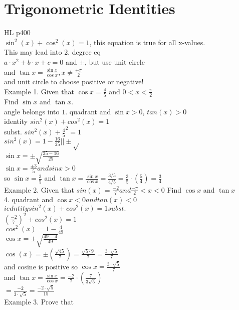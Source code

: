 \documentclass{article}
\begin{document}
  \section{Trigonometric Identities}
  HL p400\\
  $\sin^2(x)+\cos^2(x)=1$, this equation is true for all x-values.\\
  This may lead into 2. degree eq\\
  $a\cdot x^2+b\cdot x+c=0$ and $\pm$, but use unit circle\\
  and $\tan x=\frac{\sin x}{\cos x}, x\neq\frac{\pm\pi}{2}$\\
  and unit circle to choose positive or negative!\\
  Example 1. Given that $\cos x=\frac{4}{5}$ and $0<x<\frac{\pi}{2}$\\
  Find $\sin x$ and $\tan x$.\\
  angle belongs into $1.$ quadrant and $\sin x>0$, $tan(x)>0$\\
  identity $sin^2(x)+cos^2(x)=1$\\
  subst. $sin^2(x)+\frac{4}{5}^2=1$\\
  $sin^2(x)=1-\frac{16}{25}||\pm\sqrt{}$\\
  $\sin x=\pm\sqrt{\frac{25-16}{25}}$\\
  $\sin x=\frac{\pm3}{5} and sin x>0$\\
  so $\sin x=\frac{3}{5}$ and $\tan x=\frac{\sin x}{\cos x}=\frac{3/5}{4/5}=\frac{3}{5}\cdot(\frac{5}{4})=\frac{3}{4}$\\
  Example 2. Given that $sin(x)=\frac{-2}{7} and \frac{-\pi}{2}<x<0$ Find $\cos x$ and $\tan x$\\
  4. quadrant and $\cos x<0 and tan(x)<0$\\
  $iedntity sin^2(x)+cos^2(x)=1 subst.$\\
  $(\frac{-2}{7})^2+cos^2(x)=1$\\
  $\cos^2(x)=1-\frac{4}{49}$\\
  $\cos x=\pm\sqrt{\frac{49-4}{49}}$\\
  $\cos(x)=\pm(\frac{\sqrt{45}}{7})=\frac{\sqrt{5\cdot9}}{7}=\frac{3\cdot\sqrt{5}}{7}$\\
  and cosine is positive so $\cos x=\frac{3\cdot\sqrt{5}}{7}$\\
  and $\tan x=\frac{\sin x}{\cos x}=\frac{-2}{7}\cdot(\frac{7}{3\sqrt{5}})$\\
  $=\frac{-2}{3\cdot\sqrt{5}}=\frac{-2\cdot\sqrt{5}}{15}$\\
  Example 3. Prove that\\
\end{document}
